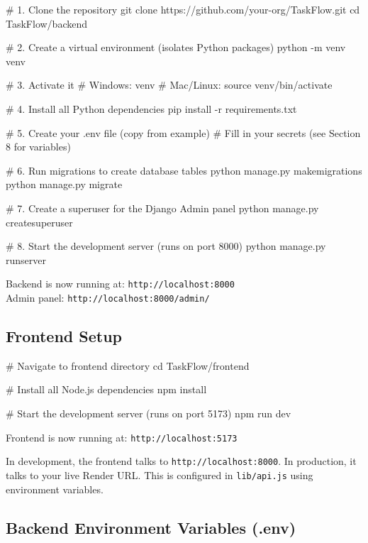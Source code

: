\documentclass[12pt,a4paper]{article}
\begin{document}
\begin{termbox}
# 1. Clone the repository
git clone https://github.com/your-org/TaskFlow.git
cd TaskFlow/backend

# 2. Create a virtual environment (isolates Python packages)
python -m venv venv

# 3. Activate it
# Windows:
venv\Scripts\activate
# Mac/Linux:
source venv/bin/activate

# 4. Install all Python dependencies
pip install -r requirements.txt

# 5. Create your .env file (copy from example)
# Fill in your secrets (see Section 8 for variables)
\end{termbox}

\begin{termbox}
# 6. Run migrations to create database tables
python manage.py makemigrations
python manage.py migrate

# 7. Create a superuser for the Django Admin panel
python manage.py createsuperuser

# 8. Start the development server (runs on port 8000)
python manage.py runserver
\end{termbox}

Backend is now running at: \texttt{http://localhost:8000}\\
Admin panel: \texttt{http://localhost:8000/admin/}

\subsection{Frontend Setup}

\begin{termbox}
# Navigate to frontend directory
cd TaskFlow/frontend

# Install all Node.js dependencies
npm install

# Start the development server (runs on port 5173)
npm run dev
\end{termbox}

Frontend is now running at: \texttt{http://localhost:5173}

\begin{notebox}
In development, the frontend talks to \texttt{http://localhost:8000}. In production, it talks to your live Render URL. This is configured in \texttt{lib/api.js} using environment variables.
\end{notebox}

\subsection{Backend Environment Variables (.env)}
\end{document}
